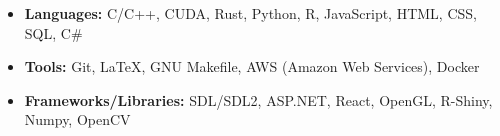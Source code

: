 \documentclass[11pt]{article}
\begin{document}
\begin{itemize}
    \item \textbf{Languages:} \hspace*{3cm} C/C++, CUDA, Rust, Python, R, JavaScript, HTML, CSS, SQL, C\#
    \item \textbf{Tools:} \hspace*{4cm} Git, \LaTeX, GNU Makefile, AWS (Amazon Web Services), Docker
    \item \textbf{Frameworks/Libraries:} \hspace*{0.9cm}SDL/SDL2, ASP.NET, React, OpenGL, R-Shiny, Numpy, OpenCV
\end{itemize}
\end{document}
